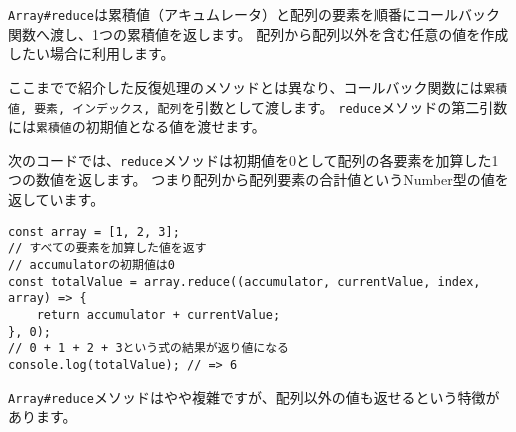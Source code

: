 \texttt{Array\#reduce}は累積値（アキュムレータ）と配列の要素を順番にコールバック関数へ渡し、1つの累積値を返します。
配列から配列以外を含む任意の値を作成したい場合に利用します。

ここまでで紹介した反復処理のメソッドとは異なり、コールバック関数には\texttt{累積値, 要素, インデックス, 配列}を引数として渡します。
\texttt{reduce}メソッドの第二引数には\texttt{累積値}の初期値となる値を渡せます。

次のコードでは、\texttt{reduce}メソッドは初期値を0として配列の各要素を加算した1つの数値を返します。
つまり配列から配列要素の合計値というNumber型の値を返しています。

\begin{lstlisting}
const array = [1, 2, 3];
// すべての要素を加算した値を返す
// accumulatorの初期値は0
const totalValue = array.reduce((accumulator, currentValue, index, array) => {
    return accumulator + currentValue;
}, 0);
// 0 + 1 + 2 + 3という式の結果が返り値になる
console.log(totalValue); // => 6
\end{lstlisting}

\texttt{Array\#reduce}メソッドはやや複雜ですが、配列以外の値も返せるという特徴があります。

